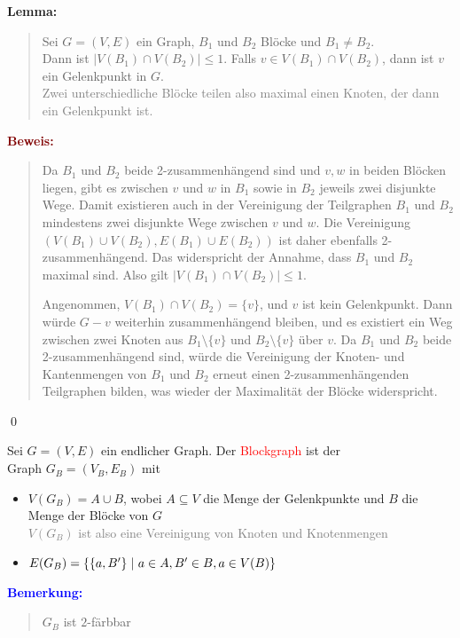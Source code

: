 \documentclass{article}
\newcommand{\smsp}{\phantom{\hspace{3px}}}
\newcommand{\red}[1]{\textcolor{red}{#1}}
\newcommand{\gray}[1]{\textcolor{gray}{#1}}
\newcommand{\blue}[1]{\textcolor{blue}{#1}}
\newcommand{\dgr}[1]{\textcolor{dgr}{#1}}
\newcommand{\maroon}[1]{\textcolor{maroon}{#1}}
\newcommand{\an}[1]{\blue{\textbf{Bemerkung: }}\begin{quote}#1\end{quote}}
\newcommand{\lem}[1]{\dgr{\textbf{Lemma: }}\begin{quote}#1\end{quote}}
\newcommand{\pr}[1]{\maroon{\textbf{Beweis: }}\begin{quote}#1\end{quote}\qed}
\renewcommand{\st}{\smsp | \smsp}
\begin{document}
\lem{
    Sei $G=(V,E)$ ein Graph, $B_1$ und $B_2$ Blöcke und $B_1 \ne B_2$.\\
    Dann ist $|V(B_1) \cap V(B_2)| \le 1$. Falls $ v \in V(B_1) \cap V(B_2)$, dann ist $v$ ein Gelenkpunkt in $G$.\\
    \gray{Zwei unterschiedliche Blöcke teilen also maximal einen Knoten, der dann ein Gelenkpunkt ist.}
}
\pr{
    Da \(B_1\) und \(B_2\) beide 2-zusammenhängend sind und \(v, w\) in beiden Blöcken liegen, gibt es zwischen \(v\) und \(w\) in \(B_1\) sowie in \(B_2\) jeweils zwei disjunkte Wege. Damit existieren auch in der Vereinigung der Teilgraphen \(B_1\) und \(B_2\) mindestens zwei disjunkte Wege zwischen \(v\) und \(w\). Die Vereinigung \((V(B_1) \cup V(B_2), E(B_1) \cup E(B_2))\) ist daher ebenfalls 2-zusammenhängend. Das widerspricht der Annahme, dass \(B_1\) und \(B_2\) maximal sind. Also gilt \(|V(B_1) \cap V(B_2)| \le 1\).

    Angenommen, \(V(B_1) \cap V(B_2) = \{v\}\), und \(v\) ist kein Gelenkpunkt. Dann würde \(G - v\) weiterhin zusammenhängend bleiben, und es existiert ein Weg zwischen zwei Knoten aus \(B_1\setminus \{v\}\) und \(B_2\setminus \{v\}\) über \(v\). Da \(B_1\) und \(B_2\) beide 2-zusammenhängend sind, würde die Vereinigung der Knoten- und Kantenmengen von \(B_1\) und \(B_2\) erneut einen 2-zusammenhängenden Teilgraphen bilden, was wieder der Maximalität der Blöcke widerspricht.
}

Sei $G = (V,E)$ ein endlicher Graph. Der  \red{Blockgraph} ist der\\
Graph $G_B = (V_B, E_B)$ mit
\begin{itemize}
    \item $V(G_B) = A \cup B$, wobei $A \subseteq V$ die Menge der Gelenkpunkte und $B$ die Menge der Blöcke von $G$\\
    \gray{$V(G_B)$ ist also eine Vereinigung von Knoten und Knotenmengen}
    \item $E(G_B) = \{\{a,B'\} \st a \in A, B' \in B, a \in V(B)\}$
\end{itemize}

\an{
    $G_B$ ist $2$-färbbar
}
\end{document}
